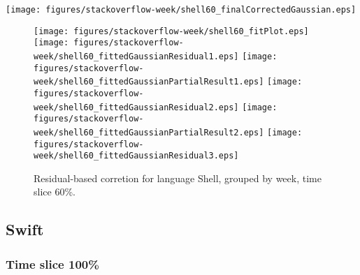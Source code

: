 \begin{center}
{\texttt{[image: figures/stackoverflow-week/shell60\_finalCorrectedGaussian.eps]}}
\end{center}

\FloatBarrier

\begin{figure}[t]
\centering
{}
{\texttt{[image: figures/stackoverflow-week/shell60\_fitPlot.eps]}}
{\texttt{[image: figures/stackoverflow-week/shell60\_fittedGaussianResidual1.eps]}}
{\texttt{[image: figures/stackoverflow-week/shell60\_fittedGaussianPartialResult1.eps]}}
{\texttt{[image: figures/stackoverflow-week/shell60\_fittedGaussianResidual2.eps]}}
{\texttt{[image: figures/stackoverflow-week/shell60\_fittedGaussianPartialResult2.eps]}}
{\texttt{[image: figures/stackoverflow-week/shell60\_fittedGaussianResidual3.eps]}}
\caption{Residual-based corretion for language Shell, grouped by week, time slice 60\%.}
\end{figure}


\FloatBarrier


\subsection{Swift}

\subsubsection{Time slice 100\%}


